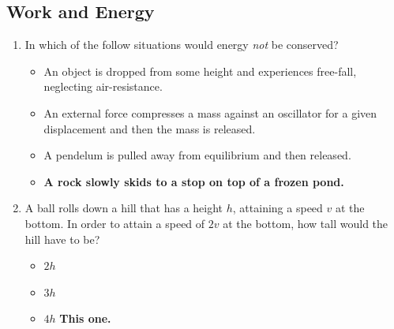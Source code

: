 \documentclass[10pt]{article}
\begin{document}
\subsection{Work and Energy}
\begin{enumerate}
\item In which of the follow situations would energy \textit{not} be conserved?
\begin{itemize}
\item An object is dropped from some height and experiences free-fall, neglecting air-resistance.
\item An external force compresses a mass against an oscillator for a given displacement and then the mass is released.
\item A pendelum is pulled away from equilibrium and then released.
\item \textbf{A rock slowly skids to a stop on top of a frozen pond.}
\end{itemize}
\item A ball rolls down a hill that has a height $h$, attaining a speed $v$ at the bottom.  In order to attain a speed of $2v$ at the bottom, how tall would the hill have to be?
\begin{itemize}
\item $2h$
\item $3h$
\item $4h$ \textbf{This one.}
\end{itemize}
\end{enumerate}
\end{document}
